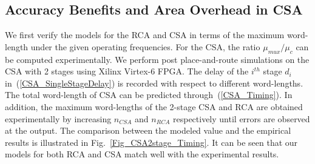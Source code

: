 \documentclass[journal]{IEEEtran}
\begin{document}
\subsection{Accuracy Benefits and Area Overhead in CSA}
We first verify the models for the RCA and CSA in terms of the maximum word-length under the given operating frequencies. For the CSA, the ratio $\mu_{mux}/\mu_c$ can be computed experimentally. We perform post place-and-route simulations on the CSA with 2 stages using Xilinx Virtex-6 FPGA. The delay of the $i^{th}$ stage $d_i$ in~(\ref{CSA_SingleStageDelay}) is recorded with respect to different word-lengths. The total word-length of CSA can be predicted through~(\ref{CSA_Timing}). In addition, the maximum word-lengths of the 2-stage CSA and RCA are obtained experimentally by increasing $n_{CSA}$ and $n_{RCA}$ respectively until errors are observed at the output. The comparison between the modeled value and the empirical results is illustrated in Fig.~\ref{Fig_CSA2stage_Timing}. It can be seen that our models for both RCA and CSA match well with the experimental results.
\end{document}
